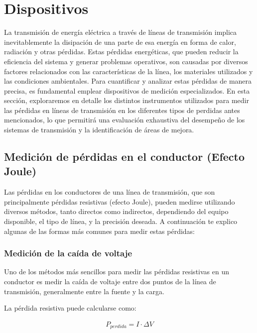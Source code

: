 \section{Dispositivos} \label{sec:dispositivos}

    La transmisión de energía eléctrica a través de líneas de transmisión implica inevitablemente la disipación de una parte de esa energía en forma de calor, radiación y otras pérdidas. Estas pérdidas energéticas, que pueden reducir la eficiencia del sistema y generar problemas operativos, son causadas por diversos factores relacionados con las características de la línea, los materiales utilizados y las condiciones ambientales. Para cuantificar y analizar estas pérdidas de manera precisa, es fundamental emplear dispositivos de medición especializados. En esta sección, exploraremos en detalle los distintos instrumentos utilizados para medir las pérdidas en líneas de transmisión en los diferentes tipos de perdidas antes mencionados, lo que permitirá una evaluación exhaustiva del desempeño de los sistemas de transmisión y la identificación de áreas de mejora.

    \subsection{Medición de pérdidas en el conductor (Efecto Joule)}

        Las pérdidas en los conductores de una línea de transmisión, que son principalmente pérdidas resistivas (efecto Joule), pueden medirse utilizando diversos métodos, tanto directos como indirectos, dependiendo del equipo disponible, el tipo de línea, y la precisión deseada. A continuación te explico algunas de las formas más comunes para medir estas pérdidas:

        \subsubsection{Medición de la caída de voltaje}

            Uno de los métodos más sencillos para medir las pérdidas resistivas en un conductor es medir la caída de voltaje entre dos puntos de la línea de transmisión, generalmente entre la fuente y la carga.

            La pérdida resistiva puede calcularse como:

            \begin{gather}
                P_{perdida} = I \cdot \Delta V \label{eq:potencia_perd}
            \end{gather}

